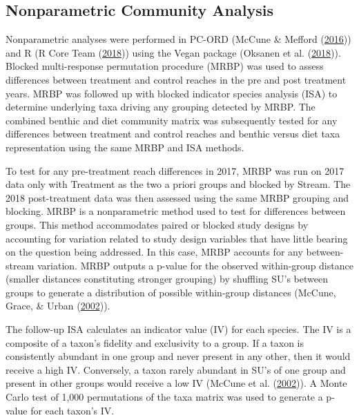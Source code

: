\documentclass[double,12pt]{beavtex}
\begin{document}
  \subsection*{Nonparametric Community
  Analysis}\label{nonparametric-community-analysis}
  
  Nonparametric analyses were performed in PC-ORD (McCune \& Mefford
  (\protect\hyperlink{ref-PC-ORD}{2016})) and R (R Core Team
  (\protect\hyperlink{ref-R-base}{2018})) using the Vegan package (Oksanen
  et al. (\protect\hyperlink{ref-vegan}{2018})). Blocked multi-response
  permutation procedure (MRBP) was used to assess differences between
  treatment and control reaches in the pre and post treatment years. MRBP
  was followed up with blocked indicator species analysis (ISA) to
  determine underlying taxa driving any grouping detected by MRBP. The
  combined benthic and diet community matrix was subsequently tested for
  any differences between treatment and control reaches and benthic versus
  diet taxa representation using the same MRBP and ISA methods.
  
  To test for any pre-treatment reach differences in 2017, MRBP was run on
  2017 data only with Treatment as the two a priori groups and blocked by
  Stream. The 2018 post-treatment data was then assessed using the same
  MRBP grouping and blocking. MRBP is a nonparametric method used to test
  for differences between groups. This method accommodates paired or
  blocked study designs by accounting for variation related to study
  design variables that have little bearing on the question being
  addressed. In this case, MRBP accounts for any between-stream variation.
  MRBP outputs a p-value for the observed within-group distance (smaller
  distances constituting stronger grouping) by shuffling SU's between
  groups to generate a distribution of possible within-group distances
  (McCune, Grace, \& Urban (\protect\hyperlink{ref-McCune2002}{2002})).
  
  The follow-up ISA calculates an indicator value (IV) for each species.
  The IV is a composite of a taxon's fidelity and exclusivity to a group.
  If a taxon is consistently abundant in one group and never present in
  any other, then it would receive a high IV. Conversely, a taxon rarely
  abundant in SU's of one group and present in other groups would receive
  a low IV (McCune et al. (\protect\hyperlink{ref-McCune2002}{2002})). A
  Monte Carlo test of 1,000 permutations of the taxa matrix was used to
  generate a p-value for each taxon's IV.
  
\end{document}
